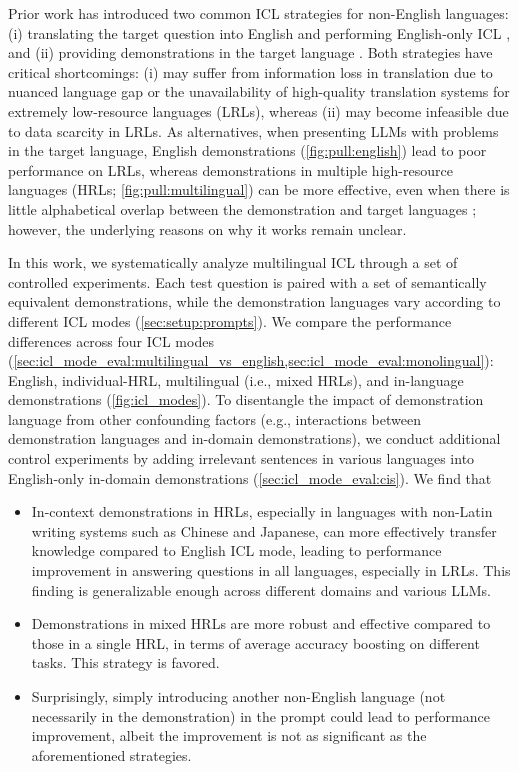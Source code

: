 Prior work has introduced two common ICL strategies for non-English languages: (i) translating the target question into English and performing English-only ICL \citep[\textit{inter alia}]{mgsm,mega,few_shot_multilingual_nlu}, and (ii) providing demonstrations in the target language \cite[\textit{in-language demonstrations;}][]{polyglot_prompt,cross_lingual_prompting,not_all_language_are_created_equal,plug}.
Both strategies have critical shortcomings: (i) may suffer from information loss in translation due to nuanced language gap \citep{dont_trust_when_question_not_in_english,roles_of_english} or the unavailability of high-quality translation systems for extremely low-resource languages (LRLs), whereas (ii) may become infeasible due to data scarcity in LRLs.
As alternatives, when presenting LLMs with problems in the target language, English demonstrations (\cref{fig:pull:english}) lead to poor performance on LRLs, whereas demonstrations in multiple high-resource languages (HRLs; \cref{fig:pull:multilingual}) can be more effective, even when there is little alphabetical overlap between the demonstration and target languages \citep{mgsm}; however, the underlying reasons on why it works remain unclear.

In this work, we systematically analyze multilingual ICL through a set of controlled experiments.
Each test question is paired with a set of semantically equivalent demonstrations, while the demonstration languages vary according to different ICL modes (\cref{sec:setup:prompts}).
We compare the performance differences across four ICL modes (\cref{sec:icl_mode_eval:multilingual_vs_english,sec:icl_mode_eval:monolingual}): English, individual-HRL, multilingual (i.e., mixed HRLs), and in-language demonstrations (\cref{fig:icl_modes}).
To disentangle the impact of demonstration language from other confounding factors (e.g., interactions between demonstration languages and in-domain demonstrations), we conduct additional control experiments by adding irrelevant sentences in various languages into English-only in-domain demonstrations (\cref{sec:icl_mode_eval:cis}).
We find that
\begin{itemize}[leftmargin=*,topsep=0pt,itemsep=-4pt]
    \item In-context demonstrations in HRLs, especially in languages with non-Latin writing systems such as Chinese and Japanese, can more effectively transfer knowledge compared to English ICL mode, leading to performance improvement in answering questions in all languages, especially in LRLs.
          This finding is generalizable enough across different domains and various LLMs.
    \item Demonstrations in mixed HRLs are more robust and effective compared to those in a single HRL, in terms of average accuracy boosting on different tasks. This strategy is favored.
    \item Surprisingly, simply introducing another non-English language (not necessarily in the demonstration) in the prompt could lead to performance improvement, albeit the improvement is not as significant as the aforementioned strategies.
\end{itemize}